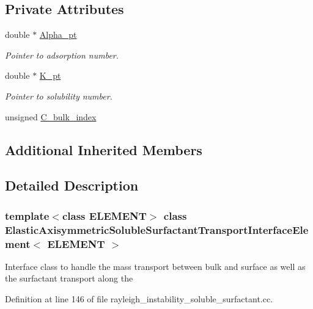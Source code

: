 \subsection*{Private Attributes}
\begin{DoxyCompactItemize}
\item 
double $\ast$ \hyperlink{classElasticAxisymmetricSolubleSurfactantTransportInterfaceElement_a612a704820dace49315bccfaca1d2e47}{Alpha\+\_\+pt}
\begin{DoxyCompactList}\small\item\em Pointer to adsorption number. \end{DoxyCompactList}\item 
double $\ast$ \hyperlink{classElasticAxisymmetricSolubleSurfactantTransportInterfaceElement_a56d585256baa21c787f25fd0678d62ea}{K\+\_\+pt}
\begin{DoxyCompactList}\small\item\em Pointer to solubility number. \end{DoxyCompactList}\item 
unsigned \hyperlink{classElasticAxisymmetricSolubleSurfactantTransportInterfaceElement_a0aa3229635561841f97bc00b616566bf}{C\+\_\+bulk\+\_\+index}
\end{DoxyCompactItemize}
\subsection*{Additional Inherited Members}


\subsection{Detailed Description}
\subsubsection*{template$<$class E\+L\+E\+M\+E\+NT$>$\newline
class Elastic\+Axisymmetric\+Soluble\+Surfactant\+Transport\+Interface\+Element$<$ E\+L\+E\+M\+E\+N\+T $>$}

Interface class to handle the mass transport between bulk and surface as well as the surfactant transport along the 

Definition at line 146 of file rayleigh\+\_\+instability\+\_\+soluble\+\_\+surfactant.\+cc.



